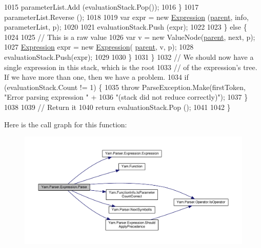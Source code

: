 \begin{DoxyCode}
1015                             parameterList.Add (evaluationStack.Pop());
1016                         \}
1017                         parameterList.Reverse ();
1018 
1019                         var expr = \textcolor{keyword}{new} \hyperlink{a00098_a17e5101d02b96d0071e7a0223e4daa3d}{Expression} (\hyperlink{a00142_af313a82103fcc2ff5a177dbb06b92f7b}{parent}, info, parameterList, p);
1020 
1021                         evaluationStack.Push (expr);
1022 
1023                     \} \textcolor{keywordflow}{else} \{
1024 
1025                         \textcolor{comment}{// This is a raw value}
1026                         var v = \textcolor{keyword}{new} ValueNode(\hyperlink{a00142_af313a82103fcc2ff5a177dbb06b92f7b}{parent}, next, p);
1027                         \hyperlink{a00098_a17e5101d02b96d0071e7a0223e4daa3d}{Expression} expr = \textcolor{keyword}{new} \hyperlink{a00098_a17e5101d02b96d0071e7a0223e4daa3d}{Expression}(
      \hyperlink{a00142_af313a82103fcc2ff5a177dbb06b92f7b}{parent}, v, p);
1028                         evaluationStack.Push(expr);
1029 
1030                     \}
1031                 \}
1032                 \textcolor{comment}{// We should now have a single expression in this stack, which is the root}
1033                 \textcolor{comment}{// of the expression's tree. If we have more than one, then we have a problem.}
1034                 \textcolor{keywordflow}{if} (evaluationStack.Count != 1) \{
1035                     \textcolor{keywordflow}{throw} ParseException.Make(firstToken, \textcolor{stringliteral}{"Error parsing expression "} +
1036                         \textcolor{stringliteral}{"(stack did not reduce correctly)"});
1037                 \}
1038 
1039                 \textcolor{comment}{// Return it}
1040                 \textcolor{keywordflow}{return} evaluationStack.Pop ();
1041 
1042             \}
\end{DoxyCode}


Here is the call graph for this function\-:
\nopagebreak
\begin{figure}[H]
\begin{center}
\leavevmode
\includegraphics[width=350pt]{a00098_a686da57aaf67d50d2832f9ee0028a979_cgraph}
\end{center}
\end{figure}


